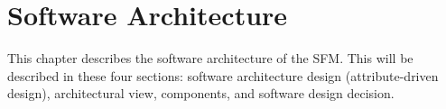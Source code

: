 \chapter{Software Architecture}
\label{ch:software}
This chapter describes the software architecture of the SFM. This will be described in these four sections: software architecture design (attribute-driven design), architectural view, components, and software design decision.





%


